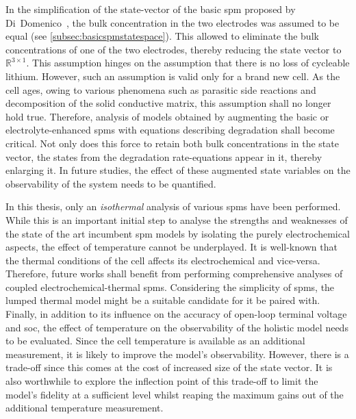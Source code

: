 In the  simplification of the  state-vector of  the basic \gls{spm}  proposed by
Di~Domenico~\cite{DiDomenico2010}, the bulk concentration  in the two electrodes
was assumed to be equal  (see \cref{subsec:basicspmstatespace}). This allowed to
eliminate the bulk concentrations of one of the two electrodes, thereby reducing
the state  vector to~$\mathbb{R}^{3  \times 1}$. This  assumption hinges  on the
assumption  that  there is  no  loss  of  cycleable  lithium. However,  such  an
assumption  is valid  only for  a brand  new cell.  As the  cell ages,  owing to
various  phenomena such  as parasitic  side reactions  and decomposition  of the
solid conductive matrix,  this assumption shall no longer  hold true. Therefore,
analysis  of models  obtained by  augmenting the  basic or  electrolyte-enhanced
\glspl{spm}  with equations  describing degradation  shall become  critical. Not
only does this force to retain both bulk concentrations in the state vector, the
states from the  degradation rate-equations appear in it,  thereby enlarging it.
In  future  studies, the  effect  of  these  augmented  state variables  on  the
observability of the system needs to be quantified.

In this thesis,  only an \emph{isothermal} analysis of  various \glspl{spm} have
been performed. While this is an important initial step to analyse the strengths
and weaknesses of  the state of the art incumbent  \gls{spm} models by isolating
the  purely  electrochemical  aspects,  the  effect  of  temperature  cannot  be
underplayed. It  is well-known that the  thermal conditions of the  cell affects
its  electrochemical  and  vice-versa.  Therefore, future  works  shall  benefit
from  performing  comprehensive   analyses  of  coupled  electrochemical-thermal
\glspl{spm}. Considering the simplicity of \glspl{spm}, the lumped thermal model
might be a suitable candidate for it be paired with. Finally, in addition to its
influence  on the  accuracy of  open-loop  terminal voltage  and \gls{soc},  the
effect of  temperature on the  observability of the  holistic model needs  to be
evaluated. Since the cell temperature is available as an additional measurement,
it is likely to improve the model's observability. However, there is a trade-off
since this comes at  the cost of increased size of the state  vector. It is also
worthwhile  to explore  the  inflection point  of this  trade-off  to limit  the
model's fidelity at  a sufficient level whilst reaping the  maximum gains out of
the additional temperature measurement.

